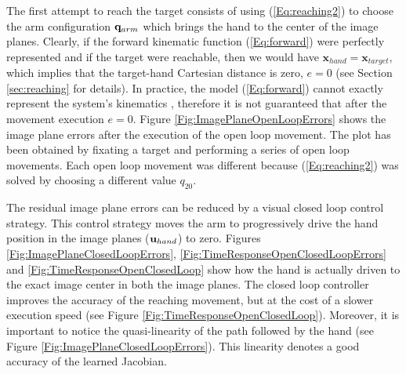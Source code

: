 The first attempt to reach the target consists of using (\ref{Eq:reaching2})
to choose the arm configuration $\mathbf q_{arm}$ which brings the hand to the center 
of the image planes. Clearly, if the forward 
kinematic function (\ref{Eq:forward}) were perfectly represented and if the 
target were reachable, then we would have 
$\mathbf x_{hand} =  \mathbf x_{target}$, which implies that the target-hand 
Cartesian distance is zero, $e=0$ (see Section \ref{sec:reaching} 
for details). In practice, the model (\ref{Eq:forward}) cannot exactly 
represent the system's kinematics
, therefore it is 
not guaranteed that after the movement 
execution $e=0$. Figure \ref{Fig:ImagePlaneOpenLoopErrors}
shows the image plane errors after the execution of the open loop movement. 
The plot has been obtained by fixating a target and performing a series of 
open loop movements. Each open loop 
movement was different because (\ref{Eq:reaching2}) was solved 
by choosing a different value $q_{20}$.

%
The residual image plane errors can be reduced 
by a visual closed loop control strategy. This control strategy moves the 
arm to progressively 
drive the hand position in the image planes ($\mathbf{u}_{hand}$) to zero. Figures
\ref{Fig:ImagePlaneClosedLoopErrors}, %
\ref{Fig:TimeResponseOpenClosedLoopErrors} and \ref{Fig:TimeResponseOpenClosedLoop}  
show how the hand is actually driven to the 
exact image center in both the image planes. The closed loop controller 
improves the accuracy of the reaching movement, but at the cost of a slower 
execution speed (see Figure \ref{Fig:TimeResponseOpenClosedLoop}). 
Moreover, it is important to notice 
the quasi-linearity of the path followed by the hand 
(see Figure \ref{Fig:ImagePlaneClosedLoopErrors}). This linearity denotes 
a good accuracy of the learned Jacobian.

